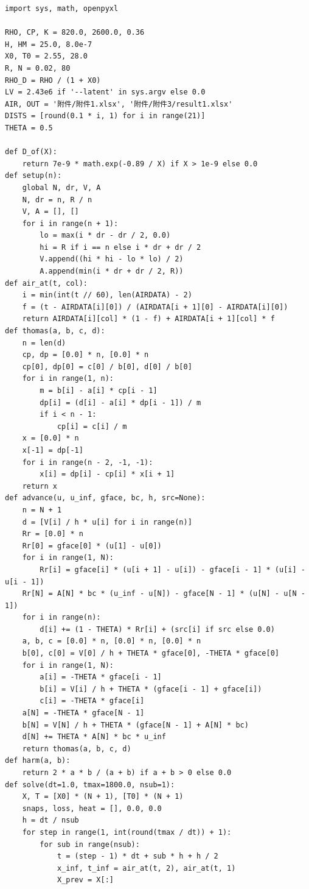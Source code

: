 \documentclass[12pt,a4paper]{article}
\begin{document}
\begin{lstlisting}
import sys, math, openpyxl

RHO, CP, K = 820.0, 2600.0, 0.36      
H, HM = 25.0, 8.0e-7                  
X0, T0 = 2.55, 28.0                   
R, N = 0.02, 80                       
RHO_D = RHO / (1 + X0)                
LV = 2.43e6 if '--latent' in sys.argv else 0.0
AIR, OUT = '附件/附件1.xlsx', '附件/附件3/result1.xlsx'
DISTS = [round(0.1 * i, 1) for i in range(21)]
THETA = 0.5                           

def D_of(X):
    return 7e-9 * math.exp(-0.89 / X) if X > 1e-9 else 0.0
def setup(n):
    global N, dr, V, A
    N, dr = n, R / n
    V, A = [], []                     
    for i in range(n + 1):
        lo = max(i * dr - dr / 2, 0.0)
        hi = R if i == n else i * dr + dr / 2
        V.append((hi * hi - lo * lo) / 2)
        A.append(min(i * dr + dr / 2, R))
def air_at(t, col):
    i = min(int(t // 60), len(AIRDATA) - 2)
    f = (t - AIRDATA[i][0]) / (AIRDATA[i + 1][0] - AIRDATA[i][0])
    return AIRDATA[i][col] * (1 - f) + AIRDATA[i + 1][col] * f
def thomas(a, b, c, d):
    n = len(d)
    cp, dp = [0.0] * n, [0.0] * n
    cp[0], dp[0] = c[0] / b[0], d[0] / b[0]
    for i in range(1, n):
        m = b[i] - a[i] * cp[i - 1]
        dp[i] = (d[i] - a[i] * dp[i - 1]) / m
        if i < n - 1:
            cp[i] = c[i] / m
    x = [0.0] * n
    x[-1] = dp[-1]
    for i in range(n - 2, -1, -1):
        x[i] = dp[i] - cp[i] * x[i + 1]
    return x
def advance(u, u_inf, gface, bc, h, src=None):
    n = N + 1
    d = [V[i] / h * u[i] for i in range(n)]
    Rr = [0.0] * n                                    
    Rr[0] = gface[0] * (u[1] - u[0])
    for i in range(1, N):
        Rr[i] = gface[i] * (u[i + 1] - u[i]) - gface[i - 1] * (u[i] - u[i - 1])
    Rr[N] = A[N] * bc * (u_inf - u[N]) - gface[N - 1] * (u[N] - u[N - 1])
    for i in range(n):
        d[i] += (1 - THETA) * Rr[i] + (src[i] if src else 0.0)
    a, b, c = [0.0] * n, [0.0] * n, [0.0] * n
    b[0], c[0] = V[0] / h + THETA * gface[0], -THETA * gface[0]
    for i in range(1, N):
        a[i] = -THETA * gface[i - 1]
        b[i] = V[i] / h + THETA * (gface[i - 1] + gface[i])
        c[i] = -THETA * gface[i]
    a[N] = -THETA * gface[N - 1]
    b[N] = V[N] / h + THETA * (gface[N - 1] + A[N] * bc)
    d[N] += THETA * A[N] * bc * u_inf
    return thomas(a, b, c, d)
def harm(a, b):                                       
    return 2 * a * b / (a + b) if a + b > 0 else 0.0
def solve(dt=1.0, tmax=1800.0, nsub=1):
    X, T = [X0] * (N + 1), [T0] * (N + 1)
    snaps, loss, heat = [], 0.0, 0.0
    h = dt / nsub
    for step in range(1, int(round(tmax / dt)) + 1):
        for sub in range(nsub):
            t = (step - 1) * dt + sub * h + h / 2     
            x_inf, t_inf = air_at(t, 2), air_at(t, 1)
            X_prev = X[:]


\end{lstlisting}
\end{document}
